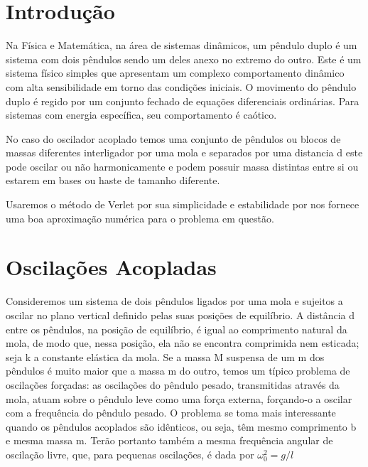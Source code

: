 \documentclass[a4paper]{article} %
\begin{document}
\section*{Introdu\c{c}\~{a}o}

\noindent

Na F\'{i}sica e Matem\'{a}tica, na \'{a}rea de sistemas din\^{a}micos, um p\^{e}ndulo duplo \'{e} um sistema com dois p\^{e}ndulos sendo um deles anexo no extremo do outro. Este \'{e} um sistema f\'{i}sico simples que apresentam um complexo comportamento din\^{a}mico com alta sensibilidade em torno das condi\c{c}\~{o}es iniciais. O movimento do p\^{e}ndulo duplo \'{e} regido por um conjunto fechado de equa\c{c}\~{o}es diferenciais ordin\'{a}rias. Para sistemas com energia espec\'{i}fica, seu comportamento \'{e} ca\'{o}tico.

No caso do oscilador acoplado temos uma conjunto de pêndulos ou blocos de massas diferentes interligador por uma mola e separados por uma distancia d este pode oscilar ou não harmonicamente e podem possuir massa distintas entre si ou estarem em bases ou haste de tamanho diferente.

Usaremos o m\'{e}todo de Verlet por sua simplicidade e estabilidade por nos fornece uma boa aproxima\c{c}\~{a}o num\'{e}rica para o problema em questão.
\newpage

\noindent 
\section{Oscilações Acopladas}\label{sec:intro}

\noindent 

Consideremos um sistema de dois pêndulos ligados por uma mola e sujeitos a oscilar no plano vertical definido pelas suas posições de equilíbrio. A distância d entre os pêndulos, na posição de equilíbrio, é igual ao comprimento natural da mola, de modo que, nessa posição, ela não se encontra comprimida nem esticada; seja k a constante elástica da mola. Se a massa M suspensa de um m dos pêndulos é muito maior que a massa m do outro, temos um típico problema de oscilações forçadas: as oscilações do pêndulo pesado, transmitidas através da mola, atuam sobre o pêndulo leve como uma força externa, forçando-o a oscilar com a frequência do pêndulo pesado. 
O problema se toma mais interessante quando os pêndulos acoplados são idênticos, ou seja, têm mesmo comprimento b e mesma massa m. Terão portanto também a mesma frequência angular de oscilação livre, que, para pequenas oscilações, é dada por $\omega_0^2 = g/l$
\end{document}
